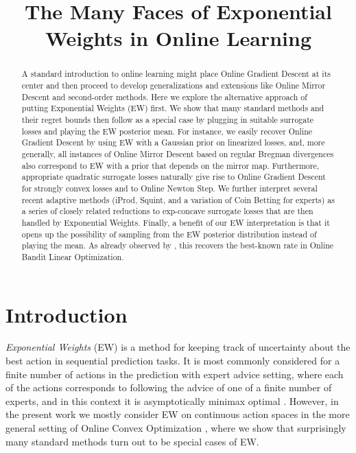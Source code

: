 \documentclass{colt2018} %
\title[The Many Faces of Exponential Weights]{The Many Faces of
Exponential Weights in Online Learning}
\begin{document}
\maketitle

\begin{abstract}
A standard introduction to online learning might place Online Gradient
Descent at its center and then proceed to develop generalizations and
extensions like Online Mirror Descent and second-order methods. Here we
explore the alternative approach of putting Exponential Weights (EW)
first. We show that many standard methods and their regret bounds then
follow as a special case by plugging in suitable surrogate losses and
playing the EW posterior mean. For instance, we easily recover Online
Gradient Descent by using EW with a Gaussian prior on linearized losses,
and, more generally, all instances of Online Mirror Descent based on
regular Bregman divergences also correspond to EW with a prior that
depends on the mirror map. Furthermore, appropriate quadratic surrogate
losses naturally give rise to Online Gradient Descent for strongly
convex losses and to Online Newton Step. We further interpret several
recent adaptive methods (iProd, Squint, and a variation of Coin Betting
for experts) as a series of closely related reductions to exp-concave
surrogate losses that are then handled by Exponential Weights. Finally,
a benefit of our EW interpretation is that it opens up the possibility
of sampling from the EW posterior distribution instead of playing the
mean. As already observed by \citeauthor{bubeck2014}, this recovers the
best-known rate in Online Bandit Linear Optimization.
\end{abstract}

% 
% 
% 
% 

\section{Introduction}

\emph{Exponential Weights} (EW) \citep{Vovk1990,LittlestoneWarmuth1994} is a method for keeping track of uncertainty about the
best action in sequential prediction tasks. It is most commonly
considered for a finite number of actions in the prediction with expert
advice setting, where each of the actions corresponds to following the
advice of one of a finite number of experts, and in this context it is
asymptotically minimax optimal
\citep[Section~2.2]{CesaBianchiLugosi2006}. However, in the present work
we mostly consider EW on continuous action spaces in the more general
setting of Online Convex Optimization \citep{hazan2016introduction},
where we show that surprisingly many standard methods turn out to be
special cases of EW.
\end{document}
